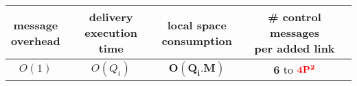 


\begin{tabularx}{0.90\columnwidth}{@{}cccc@{}}
  \makecell{message\\overhead} &  \makecell{delivery\\execution time} & \makecell{local space\\consumption} & \makecell{\# control messages\\per added link} \\ \hline
  $O(1)$ & $O(Q_i)$ & $\mathbf{O(Q_i.M)}$ & $\mathbf{6}$ to $\textcolor{red}{\mathbf{4P^2}}$ \\
\end{tabularx}

